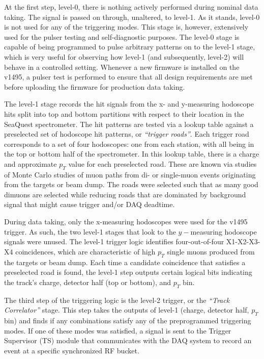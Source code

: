 At the first step, level-0, there is nothing actively performed during nominal data taking. The signal is passed on through, unaltered, to level-1. As it stands, level-0 is not used for any of the triggering modes. This stage is, however, extensively used for the pulser testing and self-diagnostic purposes. The level-0 stage is capable of being programmed to pulse arbitrary patterns on to the level-1 stage, which is very useful for observing how level-1 (and subsequently, level-2) will behave in a controlled setting. Whenever a new firmware is installed on the v1495, a pulser test is performed to ensure that all design requirements are met before uploading the firmware for production data taking.

The level-1 stage records the hit signals from the x- and y-measuring hodoscope hits split into top and bottom partitions with respect to their location in the SeaQuest spectrometer. The hit patterns are tested via a lookup table against a preselected set of hodoscope hit patterns, or \emph{``trigger roads''}. Each trigger road corresponds to a set of four hodoscopes: one from each station, with all being in the top or bottom half of the spectrometer. In this lookup table, there is a charge and approximate $p_T$ value for each preselected road. These are known via studies of Monte Carlo studies of muon paths from di- or single-muon events originating from the targets or beam dump. The roads were selected such that as many good dimuons are selected while reducing roads that are dominated by background signal that might cause trigger and/or DAQ deadtime.

During data taking, only the x-measuring hodoscopes were used for the v1495 trigger. As such, the two level-1 stages that look to the $y-$measuring hodoscope signals were unused. The level-1 trigger logic identifies four-out-of-four X1-X2-X3-X4 coincidences, which are characteristic of high $p_T$ single muons produced from the targets or beam dump. Each time a candidate coincidence that satisfies a preselected road is found, the level-1 step outputs certain logical bits indicating the track's charge, detector half (top or bottom), and $p_T$ bin.

The third step of the triggering logic is the level-2 trigger, or the \emph{``Track Correlator''} stage. This step takes the outputs of level-1 (charge, detector half, $p_T$ bin) and finds if any combinations satisfy any of the preprogrammed triggering modes. If one of these modes was satisfied, a signal is sent to the Trigger Supervisor (TS) module that communicates with the DAQ system to record an event at a specific synchronized RF bucket.


